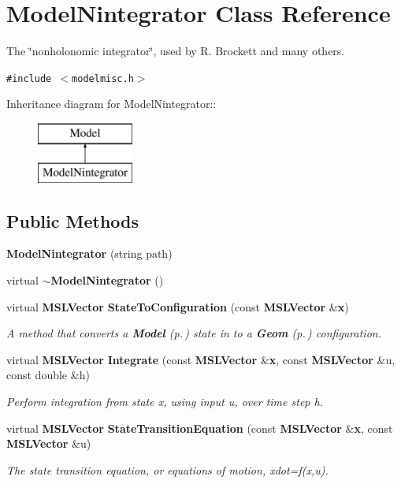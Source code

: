 \section{Model\-Nintegrator  Class Reference}
\label{classModelNintegrator}
The \char`\"{}nonholonomic integrator\char`\"{}, used by R. Brockett and many others. 


{\tt \#include $<$modelmisc.h$>$}

Inheritance diagram for Model\-Nintegrator::\begin{figure}[H]
\begin{center}
\leavevmode
\includegraphics[height=2cm]{classModelNintegrator}
\end{center}
\end{figure}
\subsection*{Public Methods}
\begin{CompactItemize}
\item 
{\bf Model\-Nintegrator} (string path)
\item 
virtual {\bf $\sim$Model\-Nintegrator} ()
\item 
virtual {\bf MSLVector} {\bf State\-To\-Configuration} (const {\bf MSLVector} \&{\bf x})
\begin{CompactList}\small\item\em A method that converts a {\bf Model} {\rm (p.\,\pageref{classModel})} state in to a {\bf Geom} {\rm (p.\,\pageref{classGeom})} configuration.\item\end{CompactList}\item 
virtual {\bf MSLVector} {\bf Integrate} (const {\bf MSLVector} \&{\bf x}, const {\bf MSLVector} \&u, const double \&h)
\begin{CompactList}\small\item\em Perform integration from state x, using input u, over time step h.\item\end{CompactList}\item 
virtual {\bf MSLVector} {\bf State\-Transition\-Equation} (const {\bf MSLVector} \&{\bf x}, const {\bf MSLVector} \&u)
\begin{CompactList}\small\item\em The state transition equation, or equations of motion, xdot=f(x,u).\item\end{CompactList}\end{CompactItemize}
